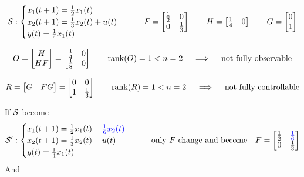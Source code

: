 \begin{example}[SISO system of order $n=2$]
    \begin{align*}
    \mathcal{S}: 
        \begin{cases}
            x_1(t+1) = \frac{1}{2} x_1(t)\\
            x_2(t+1) = \frac{1}{3}x_2(t) + u(t)\\
            y(t) = \frac{1}{4}x_1(t)
        \end{cases}
        \qquad
        F = \begin{bmatrix}
            \frac{1}{2} & 0\\
            0 & \frac{1}{3}
        \end{bmatrix}
        \qquad
        H = \begin{bmatrix}
            \frac{1}{4} & 0
        \end{bmatrix}
        \qquad
        G = \begin{bmatrix}
            0 \\
            1
        \end{bmatrix}
    \end{align*}

    \[
        O = \begin{bmatrix}
            H \\
            HF
        \end{bmatrix} = \begin{bmatrix}
            \frac{1}{4} & 0 \\
            \frac{1}{8} & 0
        \end{bmatrix}
        \qquad
        \operatorname*{rank} (O) = 1 < n = 2
        \quad\implies\quad \text{not fully observable}
    \]

    \[
        R = \begin{bmatrix}
            G & FG
        \end{bmatrix} = \begin{bmatrix}
            0 & 0 \\
            1 & \frac{1}{3}
        \end{bmatrix}
        \qquad
        \operatorname*{rank} (R) = 1 < n = 2
        \quad\implies\quad \text{not fully controllable}
    \]
    
    If $\mathcal{S}$ become 
    \begin{align*}
    \mathcal{S'}: 
        \begin{cases}
            x_1(t+1) = \frac{1}{2} x_1(t) + \color{blue} \frac{1}{6} x_2(t)\\
            x_2(t+1) = \frac{1}{3}x_2(t) + u(t)\\
            y(t) = \frac{1}{4}x_1(t)
        \end{cases}
        \qquad
        \text{only $F$ change and become}\quad
        F = \begin{bmatrix}
            \frac{1}{2} & \color{blue} \frac{1}{6} \\
            0 & \frac{1}{3}
        \end{bmatrix}
    \end{align*} 
    And  
    

\end{example}
